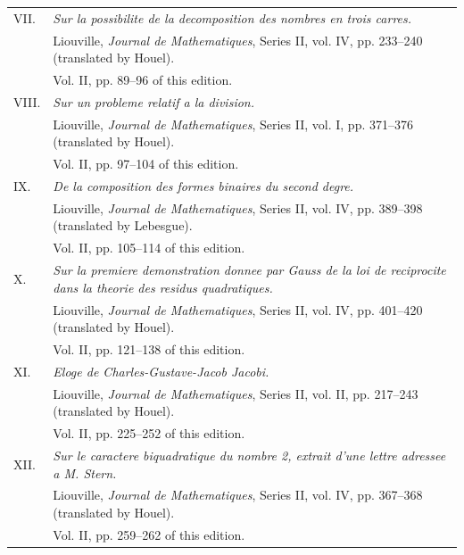\documentclass[11pt]{article}
\begin{document}
\begin{longtable}{@{}p{}p{}@{}}
VII. & \emph{Sur la possibilite de la decomposition des nombres en trois carres.}\\
& Liouville, \emph{Journal de Mathematiques}, Series II, vol. IV, pp. 233--240 (translated by Houel).\\
& Vol. II, pp. 89--96 of this edition.\\[0.45em]
VIII. & \emph{Sur un probleme relatif a la division.}\\
& Liouville, \emph{Journal de Mathematiques}, Series II, vol. I, pp. 371--376 (translated by Houel).\\
& Vol. II, pp. 97--104 of this edition.\\[0.45em]
IX. & \emph{De la composition des formes binaires du second degre.}\\
& Liouville, \emph{Journal de Mathematiques}, Series II, vol. IV, pp. 389--398 (translated by Lebesgue).\\
& Vol. II, pp. 105--114 of this edition.\\[0.45em]
X. & \emph{Sur la premiere demonstration donnee par Gauss de la loi de reciprocite dans la theorie des residus quadratiques.}\\
& Liouville, \emph{Journal de Mathematiques}, Series II, vol. IV, pp. 401--420 (translated by Houel).\\
& Vol. II, pp. 121--138 of this edition.\\[0.45em]
XI. & \emph{Eloge de Charles-Gustave-Jacob Jacobi.}\\
& Liouville, \emph{Journal de Mathematiques}, Series II, vol. II, pp. 217--243 (translated by Houel).\\
& Vol. II, pp. 225--252 of this edition.\\[0.45em]
XII. & \emph{Sur le caractere biquadratique du nombre 2, extrait d'une lettre adressee a M. Stern.}\\
& Liouville, \emph{Journal de Mathematiques}, Series II, vol. IV, pp. 367--368 (translated by Houel).\\
& Vol. II, pp. 259--262 of this edition.
\end{longtable}
\end{document}
